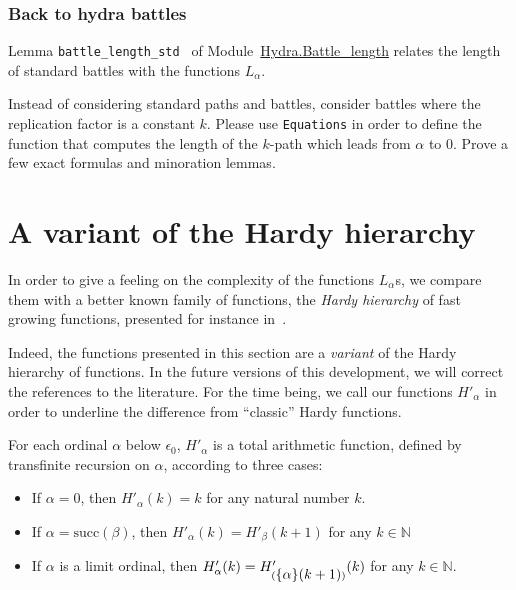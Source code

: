 \subsubsection{Back to hydra battles}
\label{def:L-alpha}

Lemma \texttt{battle\_length\_std } of
Module~\href{../theories/html/hydras.Hydra.Battle_length.html}{Hydra.Battle\_length} relates the length of standard battles with the functions $L_\alpha$.




\begin{exercise}
Instead of considering standard paths and battles, consider battles where the replication factor is a constant $k$. Please use \texttt{Equations} in order to define the function that computes the length of the $k$-path which leads  from $\alpha$ to $0$.
Prove a few  exact formulas and minoration lemmas.
\end{exercise}

\section{A variant of the Hardy hierarchy}

\label{sect:hardy}




In order to give a feeling on  the complexity of the functions  $L_\alpha$s, we compare them with a better known family of functions, the  \emph{Hardy hierarchy} of fast growing functions,
presented for instance in~\cite{Promel2013}. 

\begin{remark}
  Indeed, the functions presented in this section are a \emph{variant} of the Hardy hierarchy of functions. In the future versions of this development, we will correct the references to the literature. For the time being, we call our functions $H'_\alpha$ in order to underline the difference from ``classic'' Hardy functions.
\end{remark}

For each ordinal $\alpha$ below $\epsilon_0$, $H'_\alpha$ is 
a total arithmetic function, defined  by  transfinite recursion on $\alpha$, according to three cases:


\begin{itemize}
\item If $\alpha=0$, then $H'_\alpha (k)= k$ for any natural number $k$.
\item If $\alpha=\textrm{succ}(\beta)$, then 
$H'_\alpha(k)=H'_\beta(k+1)$ for any $k \in \mathbb{N}$
\item If $\alpha$ is a limit ordinal, then 
$H'_\alpha(k) = H'_{(\mbox{$\{\alpha\}(k+1)$})}(k)$ for any $k\in \mathbb{N}$.
\end{itemize}

